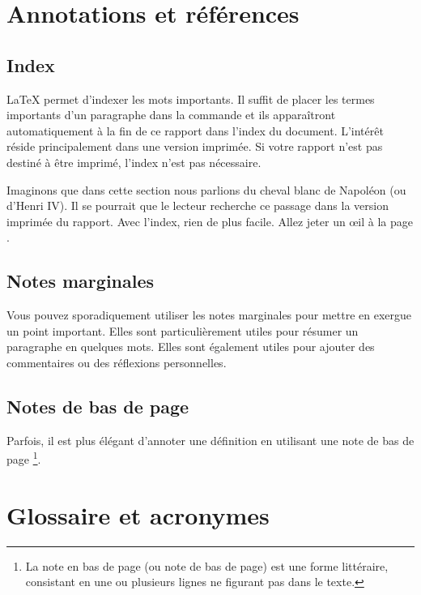 \section{Annotations et références}

\subsection{Index}
\LaTeX{} permet d'indexer les mots  importants. Il suffit de placer les termes importants d'un paragraphe dans la commande \texttt{} et ils apparaîtront automatiquement à la fin de ce rapport dans l'index du document. L'intérêt réside principalement dans une version imprimée. Si votre rapport n'est pas destiné à être imprimé, l'index n'est pas nécessaire.


Imaginons que dans cette section nous parlions du cheval blanc  de Napoléon (ou d'Henri IV). Il se pourrait que le lecteur recherche ce passage dans la version imprimée du rapport. Avec l'index, rien de plus facile. Allez jeter un œil à la page \pageref{index}.

\subsection{Notes marginales}

 Vous pouvez sporadiquement utiliser les notes marginales pour mettre en exergue un point important. Elles sont particulièrement utiles pour résumer un paragraphe en quelques mots. Elles sont également utiles pour ajouter des commentaires ou des réflexions personnelles.

\subsection{Notes de bas de page}

Parfois, il est plus élégant d'annoter une définition en utilisant une note de bas de page \footnote{La note en bas de page (ou note de bas de page) est une forme littéraire, consistant en une ou plusieurs lignes ne figurant pas dans le texte.}.

\section{Glossaire et acronymes}

